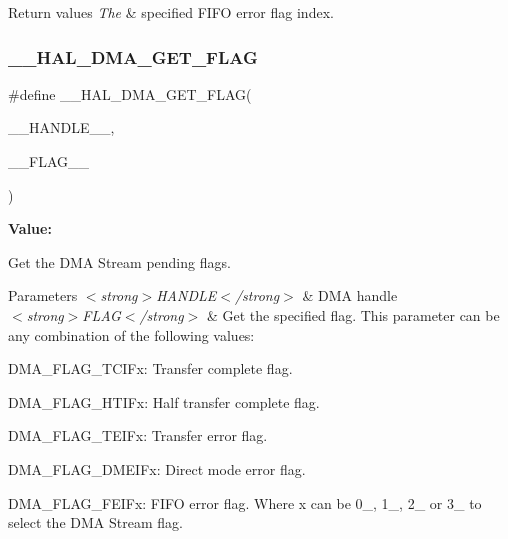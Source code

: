 \begin{DoxyRetVals}{Return values}
{\em The} & specified F\+I\+FO error flag index. \\
\hline
\end{DoxyRetVals}
\mbox{\label{group___d_m_a_ga798d4b3b3fbd32b95540967bb35b35be}} 
\subsubsection{\texorpdfstring{\_\_HAL\_DMA\_GET\_FLAG}{\_\_HAL\_DMA\_GET\_FLAG}}
{\footnotesize\ttfamily \#define \+\_\+\+\_\+\+H\+A\+L\+\_\+\+D\+M\+A\+\_\+\+G\+E\+T\+\_\+\+F\+L\+AG(\begin{DoxyParamCaption}\item[{}]{\+\_\+\+\_\+\+H\+A\+N\+D\+L\+E\+\_\+\+\_\+,  }\item[{}]{\+\_\+\+\_\+\+F\+L\+A\+G\+\_\+\+\_\+ }\end{DoxyParamCaption})}

{\bfseries Value\+:}
\begin{DoxyCode}{0}

\end{DoxyCode}


Get the D\+MA Stream pending flags. 


\begin{DoxyParams}{Parameters}
{\em $<$strong$>$\+H\+A\+N\+D\+L\+E$<$/strong$>$} & D\+MA handle \\
\hline
{\em $<$strong$>$\+F\+L\+A\+G$<$/strong$>$} & Get the specified flag. This parameter can be any combination of the following values\+: \begin{DoxyItemize}
\item D\+M\+A\+\_\+\+F\+L\+A\+G\+\_\+\+T\+C\+I\+Fx\+: Transfer complete flag. \item D\+M\+A\+\_\+\+F\+L\+A\+G\+\_\+\+H\+T\+I\+Fx\+: Half transfer complete flag. \item D\+M\+A\+\_\+\+F\+L\+A\+G\+\_\+\+T\+E\+I\+Fx\+: Transfer error flag. \item D\+M\+A\+\_\+\+F\+L\+A\+G\+\_\+\+D\+M\+E\+I\+Fx\+: Direct mode error flag. \item D\+M\+A\+\_\+\+F\+L\+A\+G\+\_\+\+F\+E\+I\+Fx\+: F\+I\+FO error flag. Where x can be 0\+\_, 1\+\_, 2\+\_ or 3\+\_ to select the D\+MA Stream flag.\end{DoxyItemize}
\\
\hline
\end{DoxyParams}

